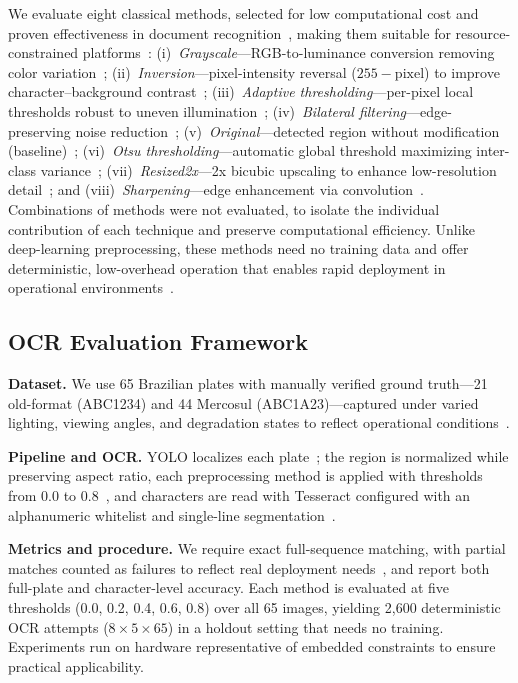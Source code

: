 \documentclass[conference,hidelinks]{IEEEtran}
\begin{document}
We evaluate eight classical methods, selected for low computational cost and proven effectiveness in document recognition~\cite{gonzalez2017digital,tavares2024comparison}, making them suitable for resource-constrained platforms~\cite{yuan2017robust,zou2020robust}: (i)~\textit{Grayscale}---RGB-to-luminance conversion removing color variation~\cite{silva2018license}; (ii)~\textit{Inversion}---pixel-intensity reversal ($255-\text{pixel}$) to improve character--background contrast~\cite{smith2007overview,zhang2021robust}; (iii)~\textit{Adaptive thresholding}---per-pixel local thresholds robust to uneven illumination~\cite{bradley1997adaptive}; (iv)~\textit{Bilateral filtering}---edge-preserving noise reduction~\cite{tomasi1998bilateral}; (v)~\textit{Original}---detected region without modification (baseline)~\cite{wang2022rethinking}; (vi)~\textit{Otsu thresholding}---automatic global threshold maximizing inter-class variance~\cite{otsu1979threshold}; (vii)~\textit{Resized2x}---2x bicubic upscaling to enhance low-resolution detail~\cite{chen2021endtoend}; and (viii)~\textit{Sharpening}---edge enhancement via convolution~\cite{zou2020robust}. Combinations of methods were not evaluated, to isolate the individual contribution of each technique and preserve computational efficiency. Unlike deep-learning preprocessing, these methods need no training data and offer deterministic, low-overhead operation that enables rapid deployment in operational environments~\cite{tang2024ultra}.

\subsection{OCR Evaluation Framework}

\textbf{Dataset.} We use 65 Brazilian plates with manually verified ground truth—21 old-format (ABC1234) and 44 Mercosul (ABC1A23)—captured under varied lighting, viewing angles, and degradation states to reflect operational conditions~\cite{silva2020synthetic,qin2022towards}.

\textbf{Pipeline and OCR.} YOLO localizes each plate~\cite{moussaoui2024enhancing}; the region is normalized while preserving aspect ratio, each preprocessing method is applied with thresholds from 0.0 to 0.8~\cite{tavares2024comparison}, and characters are read with Tesseract configured with an alphanumeric whitelist and single-line segmentation~\cite{smith2007overview}.

\textbf{Metrics and procedure.} We require exact full-sequence matching, with partial matches counted as failures to reflect real deployment needs~\cite{powers2011evaluation}, and report both full-plate and character-level accuracy. Each method is evaluated at five thresholds (0.0, 0.2, 0.4, 0.6, 0.8) over all 65 images, yielding 2{,}600 deterministic OCR attempts ($8\times5\times65$) in a holdout setting that needs no training. Experiments run on hardware representative of embedded constraints to ensure practical applicability.
\end{document}
